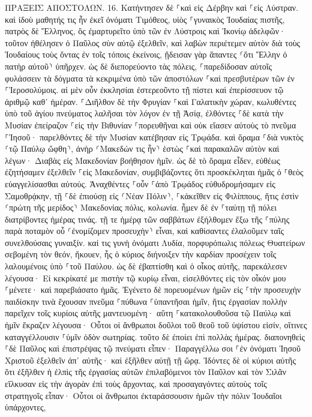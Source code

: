 \documentclass[twoside, 9pt]{extreport}
\begin{document}
ΠΡΑΞΕΙΣ ΑΠΟΣΤΟΛΩΝ.
16.
Κατήντησεν δὲ ⸀καὶ εἰς Δέρβην καὶ ⸀εἰς Λύστραν. καὶ ἰδοὺ μαθητής τις ἦν ἐκεῖ ὀνόματι Τιμόθεος, υἱὸς ⸀γυναικὸς Ἰουδαίας πιστῆς, πατρὸς δὲ Ἕλληνος, 
ὃς ἐμαρτυρεῖτο ὑπὸ τῶν ἐν Λύστροις καὶ Ἰκονίῳ ἀδελφῶν· 
τοῦτον ἠθέλησεν ὁ Παῦλος σὺν αὐτῷ ἐξελθεῖν, καὶ λαβὼν περιέτεμεν αὐτὸν διὰ τοὺς Ἰουδαίους τοὺς ὄντας ἐν τοῖς τόποις ἐκείνοις, ᾔδεισαν γὰρ ἅπαντες ⸂ὅτι Ἕλλην ὁ πατὴρ αὐτοῦ⸃ ὑπῆρχεν. 
ὡς δὲ διεπορεύοντο τὰς πόλεις, ⸀παρεδίδοσαν αὐτοῖς φυλάσσειν τὰ δόγματα τὰ κεκριμένα ὑπὸ τῶν ἀποστόλων ⸀καὶ πρεσβυτέρων τῶν ἐν ⸀Ἱεροσολύμοις. 
αἱ μὲν οὖν ἐκκλησίαι ἐστερεοῦντο τῇ πίστει καὶ ἐπερίσσευον τῷ ἀριθμῷ καθ᾽ ἡμέραν. 
⸀Διῆλθον δὲ τὴν Φρυγίαν ⸀καὶ Γαλατικὴν χώραν, κωλυθέντες ὑπὸ τοῦ ἁγίου πνεύματος λαλῆσαι τὸν λόγον ἐν τῇ Ἀσίᾳ, 
ἐλθόντες ⸀δὲ κατὰ τὴν Μυσίαν ἐπείραζον ⸀εἰς τὴν Βιθυνίαν ⸀πορευθῆναι καὶ οὐκ εἴασεν αὐτοὺς τὸ πνεῦμα ⸀Ἰησοῦ· 
παρελθόντες δὲ τὴν Μυσίαν κατέβησαν εἰς Τρῳάδα. 
καὶ ὅραμα ⸀διὰ νυκτὸς ⸂τῷ Παύλῳ ὤφθη⸃, ἀνὴρ ⸂Μακεδών τις ἦν⸃ ἑστὼς ⸀καὶ παρακαλῶν αὐτὸν καὶ λέγων· Διαβὰς εἰς Μακεδονίαν βοήθησον ἡμῖν. 
ὡς δὲ τὸ ὅραμα εἶδεν, εὐθέως ἐζητήσαμεν ἐξελθεῖν ⸀εἰς Μακεδονίαν, συμβιβάζοντες ὅτι προσκέκληται ἡμᾶς ὁ ⸀θεὸς εὐαγγελίσασθαι αὐτούς. 
Ἀναχθέντες ⸀οὖν ⸀ἀπὸ Τρῳάδος εὐθυδρομήσαμεν εἰς Σαμοθρᾴκην, τῇ ⸀δὲ ἐπιούσῃ εἰς ⸂Νέαν Πόλιν⸃, 
⸀κἀκεῖθεν εἰς Φιλίππους, ἥτις ἐστὶν ⸂πρώτη τῆς μερίδος⸃ Μακεδονίας πόλις, κολωνία. ἦμεν δὲ ἐν ⸀ταύτῃ τῇ πόλει διατρίβοντες ἡμέρας τινάς. 
τῇ τε ἡμέρᾳ τῶν σαββάτων ἐξήλθομεν ἔξω τῆς ⸀πύλης παρὰ ποταμὸν οὗ ⸂ἐνομίζομεν προσευχὴν⸃ εἶναι, καὶ καθίσαντες ἐλαλοῦμεν ταῖς συνελθούσαις γυναιξίν. 
καί τις γυνὴ ὀνόματι Λυδία, πορφυρόπωλις πόλεως Θυατείρων σεβομένη τὸν θεόν, ἤκουεν, ἧς ὁ κύριος διήνοιξεν τὴν καρδίαν προσέχειν τοῖς λαλουμένοις ὑπὸ ⸀τοῦ Παύλου. 
ὡς δὲ ἐβαπτίσθη καὶ ὁ οἶκος αὐτῆς, παρεκάλεσεν λέγουσα· Εἰ κεκρίκατέ με πιστὴν τῷ κυρίῳ εἶναι, εἰσελθόντες εἰς τὸν οἶκόν μου ⸀μένετε· καὶ παρεβιάσατο ἡμᾶς. 
Ἐγένετο δὲ πορευομένων ἡμῶν εἰς ⸀τὴν προσευχὴν παιδίσκην τινὰ ἔχουσαν πνεῦμα ⸀πύθωνα ⸀ὑπαντῆσαι ἡμῖν, ἥτις ἐργασίαν πολλὴν παρεῖχεν τοῖς κυρίοις αὐτῆς μαντευομένη· 
αὕτη ⸀κατακολουθοῦσα τῷ Παύλῳ καὶ ἡμῖν ἔκραζεν λέγουσα· Οὗτοι οἱ ἄνθρωποι δοῦλοι τοῦ θεοῦ τοῦ ὑψίστου εἰσίν, οἵτινες καταγγέλλουσιν ⸀ὑμῖν ὁδὸν σωτηρίας. 
τοῦτο δὲ ἐποίει ἐπὶ πολλὰς ἡμέρας. διαπονηθεὶς ⸀δὲ Παῦλος καὶ ἐπιστρέψας τῷ πνεύματι εἶπεν· Παραγγέλλω σοι ⸀ἐν ὀνόματι Ἰησοῦ Χριστοῦ ἐξελθεῖν ἀπ᾽ αὐτῆς· καὶ ἐξῆλθεν αὐτῇ τῇ ὥρᾳ. 
Ἰδόντες δὲ οἱ κύριοι αὐτῆς ὅτι ἐξῆλθεν ἡ ἐλπὶς τῆς ἐργασίας αὐτῶν ἐπιλαβόμενοι τὸν Παῦλον καὶ τὸν Σιλᾶν εἵλκυσαν εἰς τὴν ἀγορὰν ἐπὶ τοὺς ἄρχοντας, 
καὶ προσαγαγόντες αὐτοὺς τοῖς στρατηγοῖς εἶπαν· Οὗτοι οἱ ἄνθρωποι ἐκταράσσουσιν ἡμῶν τὴν πόλιν Ἰουδαῖοι ὑπάρχοντες, 
\end{document}
